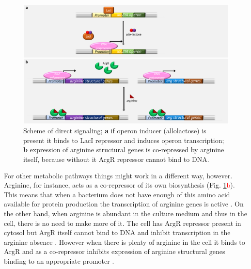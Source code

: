 \begin{figure}[ht]
  \centering
  \includegraphics[scale=0.27]{text/Pictures/DirectSignaling.png}
	\caption{Scheme of direct signaling; \textbf{a} if  operon inducer (allolactose) is present it binds to LacI repressor and induces  operon transcription; \textbf{b} expression of arginine structural genes is co-repressed by arginine itself, because without it ArgR repressor cannot bind to DNA.}
	\label{dir}
\end{figure}

For other metabolic pathways things might work in a different way, however.
Arginine, for instance, acts as a co-repressor of its own biosynthesis (Fig. \ref{dir}\textcolor{red}{b}).
This means that when a bacterium does not have enough of this amino acid available for protein production the transcription of arginine genes is active \cite{charlier2004biosynthesis, caldara2006arginine}.
On the other hand, when arginine is abundant in the culture medium and thus in the cell, there is no need to make more of it.
The cell has ArgR repressor present in cytosol but ArgR itself cannot bind to DNA and inhibit transcription in the arginine absence \cite{clark2005molecular, caldara2006arginine}.
However when there is plenty of arginine in the cell it binds to ArgR and as a co-repressor inhibits expression of arginine structural genes binding to an appropriate promoter \cite{charlier1992arginine, charlier2004biosynthesis, clark2005molecular}.

